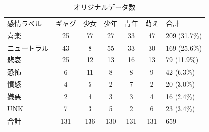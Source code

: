\begin{table}[!ht]
\begin{center}
\caption{オリジナルデータ数} %
\label{table:data_ori} %
\begin{tabular}{lccccc|l}
\hline
\multirow{2}{*}{感情ラベル} & \multirow{2}{*}{ギャグ} & \multirow{2}{*}{少女} & \multirow{2}{*}{少年} & \multirow{2}{*}{青年} & \multirow{2}{*}{萌え} & \multirow{2}{*}{合計} \\
                       &                      &                     &                     &                     &                     &                     \\ \hline
喜楽                     & 25                   & 77                  & 27                  & 33                  & 47                  & 209 (31.7\%)        \\ \hline
ニュートラル                 & 43                   & 8                   & 55                  & 33                  & 30                  & 169 (25.6\%)        \\
悲哀                     & 25                   & 12                  & 13                  & 16                  & 13                  & 79 (11.9\%)         \\
恐怖                     & 6                    & 11                  & 8                   & 8                   & 9                   & 42 (6.3\%)          \\
憤怒                     & 4                    & 5                   & 2                   & 7                   & 2                   & 20 (3.0\%)          \\
嫌悪                     & 2                    & 4                   & 3                   & 3                   & 4                   & 16 (2.4\%)          \\ \hline
UNK                    & 7                    & 3                   & 5                   & 2                   & 6                   & 23 (3.4\%)          \\ \hline
合計                     & 131                  & 136                 & 130                 & 131                 & 131                 & 659
\end{tabular}
\end{center}
\end{table}

